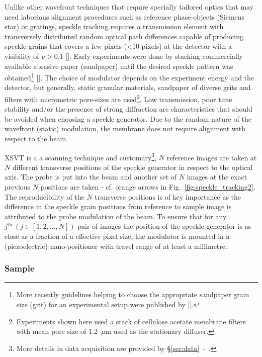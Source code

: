 \begin{refsection}
Unlike other wavefront techniques that require specially tailored optics that may need laborious alignment procedures such as reference phase-objects (Siemens star) or gratings, speckle tracking requires a transmission element with transversely distributed random optical path differences capable of producing speckle-grains that covers a few pixels (<10 pixels) at the detector with a visibility of $ v>0.1$ [\cite[\textit{\S2.3}]{Berujon2020a}]. Early experiments were done by stacking commercially available abrasive paper (sandpaper) until the desired speckle pattern was obtained\footnote{More recently guidelines helping to choose the appropriate sandpaper grain size (grit) for an experimental setup were published by [\cite{Tian2020}].} [\cite{Morgan2012, Wang2016}]. The choice of modulator depends on the experiment energy and the detector, but generally, static granular materials, sandpaper of diverse grits and filters with micrometric pore-sizes are used\footnote{Experiments shown here used a stack of cellulose acetate membrane filters with mean pore size of 1.2~$\mu$m used as the stationary diffuser.}. Low transmission, poor time stability and/or the presence of strong diffraction are characteristics that should be avoided when choosing a speckle generator. Due to the random nature of the wavefront (static) modulation, the membrane does not require alignment with respect to the beam. 

XSVT is a a scanning technique and customary\footnote{More details in data acquisition are provided by \S\ref{sec:data}~-~\textit{}.}, $N$ reference images are taken at $N$ different transverse positions of the speckle generator in respect to the optical axis. The probe is put into the beam and another set of $N$ images at the exact previous $N$ positions are taken - cf. orange arrows in Fig.~\ref{fig:speckle_tracking2}. The reproducibility of the $N$ transverse positions is of key importance as the difference in the speckle grain positions from reference to sample image is attributed to the probe modulation of the beam. To ensure that for any $j^\text{th}~(j\in[1,2,...,N])$ pair of images the position of the speckle generator is as close as a fraction of a effective pixel size, the modulator is mounted in a (piezoelectric) nano-positioner with travel range of at least a millimetre. 

\subsubsection*{Sample}


\end{refsection}
